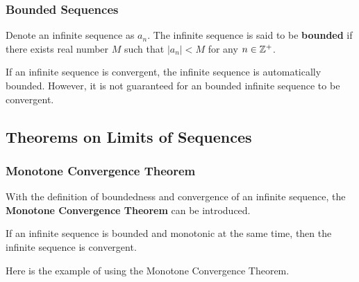 \documentclass[a4paper,12pt]{article}
\begin{document}
\subsubsection{Bounded Sequences}
\begin{dft}
  Denote an infinite sequence as $a_{n}$. The infinite sequence is said to be \textbf{bounded} if there exists real number $M$ such that $\left| a_{n}\right| <M$ for any $n\in \mathbb{Z}^{+}$.
\end{dft}\n

If an infinite sequence is convergent, the infinite sequence is automatically bounded. However, it is not guaranteed for an bounded infinite sequence to be convergent.

\subsection{Theorems on Limits of Sequences}
\subsubsection{Monotone Convergence Theorem}
With the definition of boundedness and convergence of an infinite sequence, the \textbf{Monotone Convergence Theorem} can be introduced.\n

\begin{thm}
  If an infinite sequence is bounded and monotonic at the same time, then the infinite sequence is convergent.
\end{thm}\n

Here is the example of using the Monotone Convergence Theorem.\n
\end{document}
